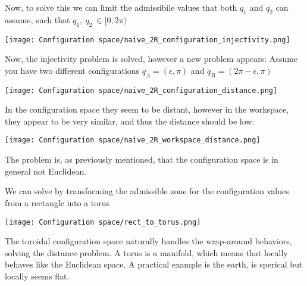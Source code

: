 \begin{example}
    Now, to solve this we can limit the admissibile values that both $q_1$ and $q_2$ can assume, such that $q_1, \ q_2 \ \in [0,2\pi)$

    \begin{center}
        \texttt{[image: Configuration space/naive\_2R\_configuration\_injectivity.png]}
    \end{center}

    Now, the injectivity problem is solved, however a new problem appears:
    Assume you have two different configurations $q_A = (\epsilon,\pi)$ and $q_B = (2\pi-\epsilon,\pi)$

    \begin{center}
        \texttt{[image: Configuration space/naive\_2R\_configuration\_distance.png]}
    \end{center}

    In the configuration space they seem to be distant, however in the workspace, they appear to be very similar, and thus the distance should be low:

    \begin{center}
        \texttt{[image: Configuration space/naive\_2R\_workspace\_distance.png]}
    \end{center}

    The problem is, as previously mentioned, that the configuration space is in general not Euclidean.

    We can solve by transforming the admissible zone for the configuration values from a rectangle into a torus

    \begin{center}
        \texttt{[image: Configuration space/rect\_to\_torus.png]}
    \end{center}

    The toroidal configuration space naturally handles the wrap-around behaviors, solving the distance problem.
    A torus is a manifold, which means that locally behaves like the Euclidean space.
    A practical example is the earth, is sperical but locally seems flat.
\end{example}